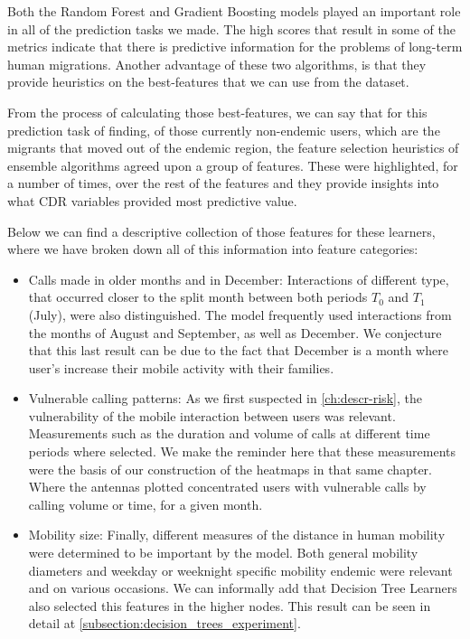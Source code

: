 
Both the Random Forest and Gradient Boosting models played an important role in all of the prediction tasks we made.
The high scores that result in some of the metrics indicate that there is predictive information for the problems of long-term human migrations.
Another advantage of these two algorithms, is that they provide heuristics on the best-features that we can use from the dataset.

From the process of calculating those best-features, we can say that for this prediction task of finding, of those currently non-endemic users, which are the migrants that moved out of the endemic region, the feature selection heuristics of ensemble algorithms agreed upon a group of features.
These were highlighted, for a number of times, over the rest of the features and they provide insights into what CDR variables provided most predictive value.

Below we can find a descriptive collection of those features for these learners, where we have broken down all of this information into feature categories:

\begin{itemize}

    \item Calls made in older months and in December: Interactions of different type, that occurred closer to the split month between both periods $T_0$ and $T_1$ (July), were also distinguished.
    The model frequently used interactions from the months of August and September, as well as December.
    We conjecture that this last result can be due to the fact that December is a month where user's increase their mobile activity with their families.

    \item Vulnerable calling patterns: As we first suspected in \cref{ch:descr-risk}, the vulnerability of the mobile interaction between users was relevant.
    Measurements such as the duration and volume of calls at different time periods where selected.
    We make the reminder here that these measurements were the basis of our construction of the heatmaps in that same chapter.
    Where the antennas plotted concentrated users with vulnerable calls by calling volume or time, for a given month.

    \item Mobility size: Finally, different measures of the distance in human mobility were determined to be important by the model. Both general mobility diameters and weekday or weeknight specific mobility endemic were relevant and on various occasions.
    We can informally add that Decision Tree Learners also selected this features in the higher nodes.
    This result can be seen in detail at \cref{subsection:decision_trees_experiment}.

\end{itemize}


